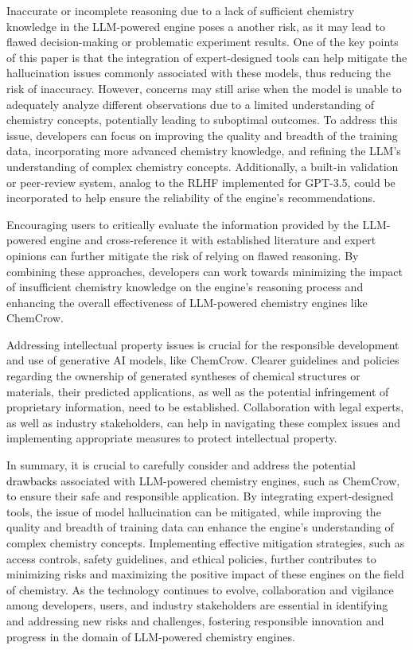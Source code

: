 \documentclass[10pt]{article}
\newcommand{\blue}[1]{\textcolor{black}{#1}}
\begin{document}
Inaccurate or incomplete reasoning due to a lack of sufficient chemistry knowledge in the LLM-powered engine poses a another risk, as it may lead to flawed decision-making or problematic experiment results. One of the key points of this paper is that the integration of expert-designed tools can help mitigate the hallucination issues commonly associated with these models, thus reducing the risk of inaccuracy.
However, concerns may still arise when the model is unable to adequately analyze different observations due to a limited understanding of chemistry concepts, potentially leading to suboptimal outcomes. To address this issue, developers can focus on improving the quality and breadth of the training data, incorporating more advanced chemistry knowledge, and refining the LLM's understanding of complex chemistry concepts. Additionally, a built-in validation or peer-review system, analog to the RLHF implemented for GPT-3.5\cite{gao2022scaling, radford2018improving}, could be incorporated to help ensure the reliability of the engine's recommendations.

Encouraging users to critically evaluate the information provided by the LLM-powered engine and cross-reference it with established literature and expert opinions can further mitigate the risk of relying on flawed reasoning\cite{Li2021TrustworthyAF}. By combining these approaches, developers can work towards minimizing the impact of insufficient chemistry knowledge on the engine's reasoning process and enhancing the overall effectiveness of LLM-powered chemistry engines\cite{Hocky_2022} like ChemCrow.

Addressing intellectual property issues is crucial for the responsible development and use of generative AI models\cite{henderson2023foundation}, like ChemCrow. Clearer guidelines and policies regarding the ownership of generated syntheses of chemical structures or materials, their predicted applications, as well as the potential \blue{infringement} of proprietary information, need to be established. Collaboration with legal experts, as well as industry stakeholders, can help in navigating these complex issues and implementing appropriate measures to protect intellectual property.

In summary, it is crucial to carefully consider and address the potential \blue{drawbacks} associated with LLM-powered chemistry engines, such as ChemCrow, to ensure their safe and responsible application. By integrating expert-designed tools, the issue of model hallucination can be mitigated, while improving the quality and breadth of training data can enhance the engine's understanding of complex chemistry concepts. Implementing effective mitigation strategies, such as access controls, safety guidelines, and ethical policies, further contributes to minimizing risks and maximizing the positive impact of these engines on the field of chemistry. As the technology continues to evolve, collaboration and vigilance among developers, users, and industry stakeholders are essential in identifying and addressing new risks and challenges\cite{askell2019role, neufville_collective_2021}, fostering responsible innovation and progress in the domain of LLM-powered chemistry engines.
\end{document}

